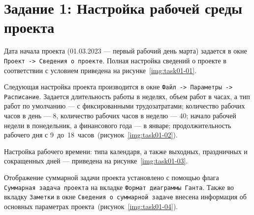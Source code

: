 \section{Задание 1: Настройка рабочей среды проекта}

Дата начала проекта (01.03.2023 --- первый рабочий день марта) задается в окне
\texttt{Проект -> Сведения о проекте}. Полная настройка сведений о проекте в
соответствии с условием приведена на рисунке~\ref{img:task01-01}.


Следующая настройка проекта производится в окне \texttt{Файл -> Параметры ->
Расписание}.  Задается длительность работы в неделях, объем работ в часах, а тип
работ по умолчанию --- с фиксированными трудозатратами; количество рабочих
часов в день --- 8, количество рабочих часов в неделю --- 40; начало рабочей
недели в понедельник, а финансового года --- в январе; продолжительность
рабочего дня с 9~до~18~часов~(рисунок~\ref{img:task01-02}).


Настройка рабочего времени: типа календаря, а также выходных, праздничных и
сокращенных дней --- приведена на рисунке~\ref{img:task01-03}.


Отображение суммарной задачи проекта установлено с помощью флага
\texttt{Суммарная задача проекта} на вкладке \texttt{Формат диаграммы Ганта}.
Также во вкладку \texttt{Заметки} в окне \texttt{Сведения о суммарной задаче}
внесена информация об основных параметрах проекта~(рисунок~\ref{img:task01-04}).

